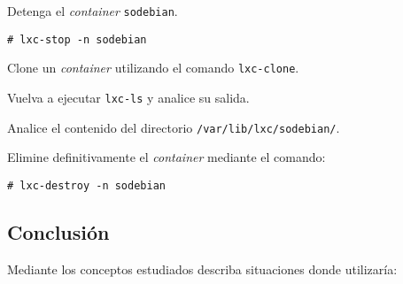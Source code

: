 \begin{questions}

  \question Detenga el \textit{container} \texttt{sodebian}.
\begin{verbatim}
# lxc-stop -n sodebian
\end{verbatim}
  
  \question Clone un \textit{container} utilizando el comando
  \texttt{lxc-clone}.

  \question Vuelva a ejecutar \texttt{lxc-ls} y analice su salida.

  \question Analice el contenido del directorio \texttt{/var/lib/lxc/sodebian/}.
  
  \question Elimine definitivamente el \textit{container} mediante el comando:
\begin{verbatim}
# lxc-destroy -n sodebian
\end{verbatim}  
\end{questions}

\subsection{Conclusión}
\begin{questions}
  \question Mediante los conceptos estudiados describa situaciones donde
  utilizaría:
\end{questions}

